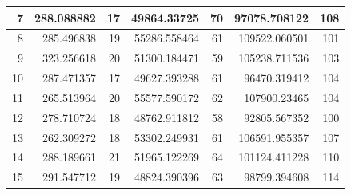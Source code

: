 \begin{table}
\begin{adjustwidth}{}{}
{{\begin{tabular}{|r|r|r|r|r|r|r|}
					\hline
					7                                          & 288.088882                   & 17                                    & 49864.33725                    & 70                                    & 97078.708122                 & 108                                    \\ 
					\hline
					8                                          & 285.496838                   & 19                                    & 55286.558464                   & 61                                    & 109522.060501                & 101                                    \\ 
					\hline
					9                                          & 323.256618                   & 20                                    & 51300.184471                   & 59                                    & 105238.711536                & 103                                    \\ 
					\hline
					10                                         & 287.471357                   & 17                                    & 49627.393288                   & 61                                    & 96470.319412                 & 104                                    \\ 
					\hline
					11                                         & 265.513964                   & 20                                    & 55577.590172                   & 62                                    & 107900.23465                 & 104                                    \\ 
					\hline
					12                                         & 278.710724                   & 18                                    & 48762.911812                   & 58                                    & 92805.567352                 & 100                                    \\ 
					\hline
					13                                         & 262.309272                   & 18                                    & 53302.249931                   & 61                                    & 106591.955357                & 107                                    \\ 
					\hline
					14                                         & 288.189661                   & 21                                    & 51965.122269                   & 64                                    & 101124.411228                & 110                                    \\ 
					\hline
					15                                         & 291.547712                   & 19                                    & 48824.390396                   & 63                                    & 98799.394608                 & 114                                    \\ 

\end{tabular}}}
\end{adjustwidth}
\end{table}
